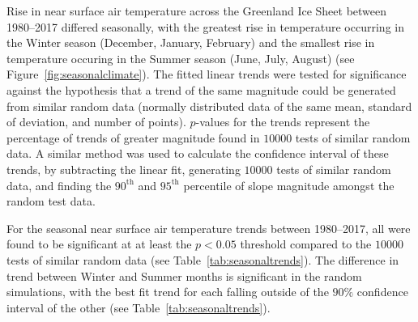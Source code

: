 \documentclass[11pt]{report}
\begin{document}
Rise in near surface air temperature across the Greenland Ice Sheet between 1980--2017 differed seasonally, with the greatest rise in temperature occurring in the Winter season (December, January, February) and the smallest rise in temperature occuring in the Summer season (June, July, August) (see Figure~\ref{fig:seasonalclimate}). The fitted linear trends were tested for significance against the hypothesis that a trend of the same magnitude could be generated from similar random data (normally distributed data of the same mean, standard of deviation, and number of points). $p$-values for the trends represent the percentage of trends of greater magnitude found in $10000$ tests of similar random data. A similar method was used to calculate the confidence interval of these trends, by subtracting the linear fit, generating $10000$ tests of similar random data, and finding the $90^{\mathrm{th}}$ and $95^{\mathrm{th}}$ percentile of slope magnitude amongst the random test data. 

For the seasonal near surface air temperature trends between 1980--2017, all were found to be significant at at least the $p < 0.05$ threshold compared to the $10000$ tests of similar random data (see Table~\ref{tab:seasonaltrends}). The difference in trend between Winter and Summer months is significant in the random simulations, with the best fit trend for each falling outside of the $90\%$ confidence interval of the other (see Table~\ref{tab:seasonaltrends}).
\end{document}
